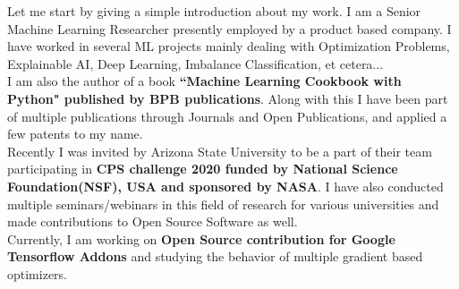 \begin{justify}
    Let me start by giving a simple introduction about my work. I am a Senior Machine Learning Researcher presently employed by a product based company. I have worked in several ML projects mainly dealing with Optimization Problems, Explainable AI, Deep Learning, Imbalance Classification, et cetera...\\
    I am also the author of a book \textbf{``Machine Learning Cookbook with Python" published by BPB publications}. Along with this I have been part of multiple publications through Journals and Open Publications, and applied a few patents to my name.\\
    Recently I was invited by Arizona State University to be a part of their team participating in \textbf{CPS challenge 2020 funded by National Science Foundation(NSF), USA and sponsored by NASA}. I have also conducted multiple seminars/webinars in this field of research for various universities and made contributions to Open Source Software as well.\\
    Currently, I am working on \textbf{Open Source contribution for Google Tensorflow Addons} and studying the behavior of multiple gradient based optimizers.
\end{justify}
